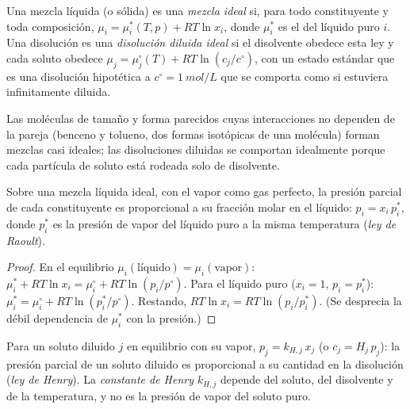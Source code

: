 \begin{definition}\label{def:b2:chemical-potential:ideal-mixture}
Una mezcla líquida (o sólida) es una \emph{mezcla ideal}
si, para todo constituyente y toda composición,
$\mu_i = \mu_i^*(T, p) + RT\ln x_i$, donde $\mu_i^*$ es el 
del líquido puro $i$. Una disolución es una \emph{disolución diluida
ideal} si el disolvente obedece esta ley y cada
soluto obedece $\mu_j = \mu_j^\circ(T) + RT\ln(c_j/c^\circ)$, con un estado
estándar que es una disolución hipotética a $c^\circ = \qty{1}{mol/L}$ que se comporta
como si estuviera infinitamente diluida.
\end{definition}

Las moléculas de tamaño y forma parecidos cuyas interacciones no dependen de
la pareja (benceno y tolueno, dos formas isotópicas de una molécula) forman
mezclas casi ideales; las disoluciones diluidas se comportan idealmente porque cada partícula de
soluto está rodeada solo de disolvente.

\begin{theorem}\label{thm:b2:chemical-potential:raoult}
Sobre una mezcla líquida ideal, con el vapor como gas perfecto, la presión
parcial de cada constituyente es proporcional a su fracción molar en el
líquido: $p_i = x_i\,p_i^*$, donde $p_i^*$ es la presión de vapor del líquido
puro a la misma temperatura (\emph{ley de Raoult}).
\end{theorem}

\begin{proof}
En el equilibrio $\mu_i(\text{líquido}) = \mu_i(\text{vapor})$: $\mu_i^* +
RT\ln x_i = \mu_i^\circ + RT\ln(p_i/p^\circ)$. Para el líquido puro ($x_i = 1$,
$p_i = p_i^*$): $\mu_i^* = \mu_i^\circ + RT\ln(p_i^*/p^\circ)$. Restando,
$RT\ln x_i = RT\ln(p_i/p_i^*)$. (Se desprecia la débil dependencia de $\mu_i^*$ con la
presión.)
\end{proof}

\begin{proposition}\label{prop:b2:chemical-potential:henry}
Para un soluto diluido $j$ en equilibrio con su vapor, $p_j = k_{H,j}\,x_j$
(o $c_j = H_j\,p_j$): la presión parcial de un soluto diluido es
proporcional a su cantidad en la disolución (\emph{ley de
Henry}). La \emph{constante de Henry}
$k_{H,j}$ depende del soluto, del disolvente y de la temperatura, y no es
la presión de vapor del soluto puro.
\end{proposition}

